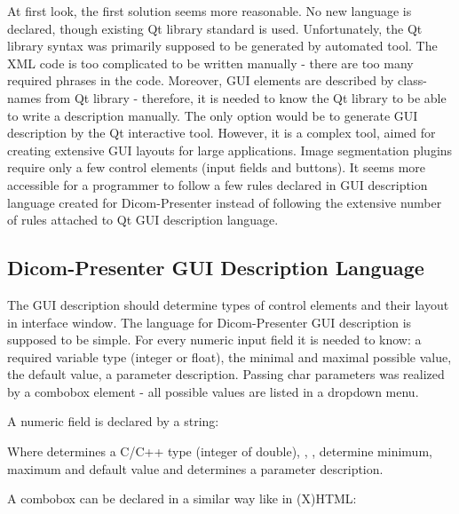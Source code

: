 At first look, the first solution seems more reasonable. No new language is declared, though existing Qt library standard is used. Unfortunately, the Qt library syntax was primarily supposed to be generated by automated tool. The XML code is too complicated to be written manually - there are too many required phrases in the code. Moreover, GUI elements are described by class-names from Qt library - therefore, it is needed to know the Qt library to be able to write a description manually. The only option would be to generate GUI description by the Qt interactive tool. However, it is a complex tool, aimed for creating extensive GUI layouts for large applications. Image segmentation plugins require only a few control elements (input fields and buttons). It seems more accessible for a programmer to follow a few rules declared in GUI description language created for Dicom-Presenter instead of following the extensive number of rules attached to Qt GUI description language.

\subsection{Dicom-Presenter GUI Description Language}

The GUI description should determine types of control elements and their layout in interface window. The language for Dicom-Presenter GUI description is supposed to be simple. For every numeric input field it is needed to know: a required variable type (integer or float), the minimal and maximal possible value, the default value, a parameter description. Passing char parameters was realized by a combobox element - all possible values are listed in a dropdown menu.

A numeric field is declared by a string:


Where  determines a C/C++ type (integer of double), , ,  determine minimum, maximum and default value and  determines a parameter description.

A combobox can be declared in a similar way like in (X)HTML:

\noindent \indent {}\\
\indent \indent {}\\
\indent \indent {}\\
\indent {}

